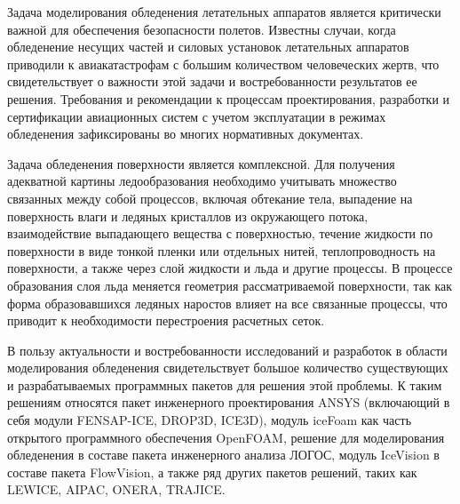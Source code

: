 \documentclass[a4paper,14pt]{extarticle}                     %
\theoremstyle{plain}                                         %
\begin{document}
Задача моделирования обледенения летательных аппаратов является критически важной для обеспечения безопасности полетов.
Известны случаи, когда обледенение несущих частей и силовых установок летательных аппаратов приводили к авиакатастрофам с большим количеством человеческих жертв,
что свидетельствует о важности этой задачи и востребованности результатов ее решения.
Требования и рекомендации к процессам проектирования, разработки и сертификации авиационных систем с учетом эксплуатации в режимах обледенения зафиксированы во многих нормативных документах.

Задача обледенения поверхности является комплексной.
Для получения адекватной картины ледообразования необходимо учитывать множество связанных между собой процессов, включая обтекание тела, выпадение на поверхность влаги и ледяных кристаллов из окружающего потока, взаимодействие выпадающего вещества с поверхностью, течение жидкости по поверхности в виде тонкой пленки или отдельных нитей, теплопроводность на поверхности, а также через слой жидкости и льда и другие процессы.
В процессе образования слоя льда меняется геометрия рассматриваемой поверхности, так как форма образовавшихся ледяных наростов влияет на все связанные процессы, что приводит к необходимости перестроения расчетных сеток.

В пользу актуальности и востребованности исследований и разработок в области моделирования обледенения свидетельствует большое количество существующих и разрабатываемых программных пакетов для решения этой проблемы.
К таким решениям относятся пакет инженерного проектирования ANSYS (включающий в себя модули FENSAP-ICE, DROP3D, ICE3D), модуль iceFoam как часть открытого программного обеспечения OpenFOAM, решение для моделирования обледенения в составе пакета инженерного анализа ЛОГОС, модуль IceVision в составе пакета FlowVision, а также ряд других пакетов решений, таких как LEWICE, AIPAC, ONERA, TRAJICE.
\end{document}

